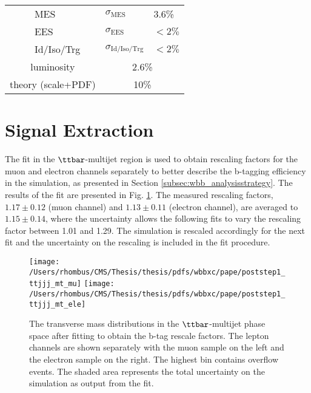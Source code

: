 \begin{table}[htb]
\begin{center}
{\begin{tabular}{c|c|l|l|l}
            {}                                   &           {}                                  & MES           & $\sigma_{\mathrm{MES}}$ & 3.6\% \\
            {}                                   &           {}                                  & EES           & $\sigma_{\mathrm{EES}}$ & $<2\%$ \\ %
            {}                                   &           {}                                  & Id/Iso/Trg    & $\sigma_{\mathrm{Id/Iso/Trg}}$ & $<2\%$ \\
\hline
\hline
            \multicolumn{3}{c|}{luminosity}         & \multicolumn{2}{c}{2.6\%}  \\
            \multicolumn{3}{c|}{theory (scale+PDF)} & \multicolumn{2}{c}{10\%}   \\


\end{tabular}
}
\end{center}
\end{table}

\section{Signal Extraction}

\label{sec:results}

The fit in the $\ttbar$-multijet region
 is used to obtain rescaling factors for
 the muon and electron channels separately
 to better describe the
 b-tagging efficiency in the simulation,
 as presented in Section \ref{subsec:wbb_analysisstrategy}.
The results of the fit are presented in Fig. \ref{fig:step1_ttjjj_fitted}.
The measured rescaling factors, $1.17 \pm 0.12$ (muon channel) and
 $1.13 \pm 0.11$ (electron channel), are averaged to $1.15 \pm 0.14$, where
 the uncertainty allows the following fits to
 vary the rescaling factor between 1.01 and 1.29.
The simulation is rescaled accordingly for the next fit and
 the uncertainty on the rescaling is included in the fit procedure.

\begin{figure}[htbp]
\center
\texttt{[image: /Users/rhombus/CMS/Thesis/thesis/pdfs/wbbxc/pape/poststep1\_ttjjj\_mt\_mu]}
\texttt{[image: /Users/rhombus/CMS/Thesis/thesis/pdfs/wbbxc/pape/poststep1\_ttjjj\_mt\_ele]}
\caption{
  The transverse mass distributions in the $\ttbar$-multijet phase space after fitting to obtain the b-tag rescale factors.
  The lepton channels are shown separately with the muon sample on the left and the electron sample on the right.
  The highest bin contains overflow events.
 The shaded area represents the total uncertainty on the simulation as output from the fit.
 }
\label{fig:step1_ttjjj_fitted}
\end{figure}

